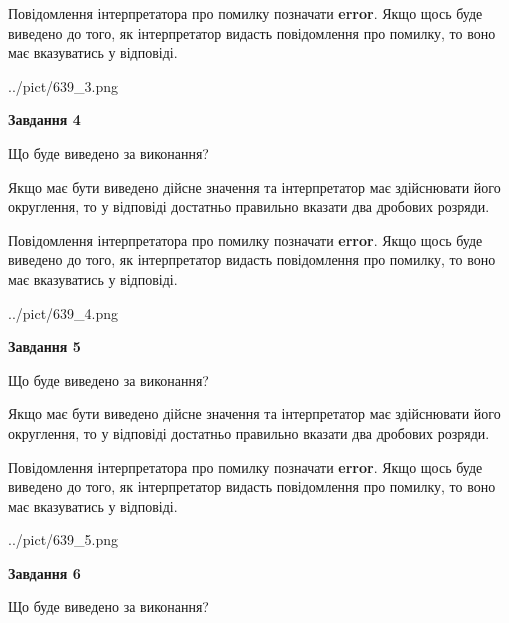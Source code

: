 \documentclass[12pt, ukrainian]{article}
\begin{document}
{\begin {Large}
Повідомлення інтерпретатора про помилку позначати \textbf{error}.
Якщо щось буде виведено до того, як інтерпретатор видасть повідомлення про помилку, 
то воно має вказуватись у відповіді. \par

\begin{center}
	{../pict/639_3.png}
\end{center}
\newpage

{\begin {center}\textbf{Завдання 4}\end {center}}\par
Що буде виведено за виконання? \par

Якщо має бути виведено дійсне значення та інтерпретатор має здійснювати його округлення, 
то у відповіді достатньо правильно вказати два дробових розряди.

Повідомлення інтерпретатора про помилку позначати \textbf{error}.
Якщо щось буде виведено до того, як інтерпретатор видасть повідомлення про помилку, 
то воно має вказуватись у відповіді. \par

\begin{center}
	{../pict/639_4.png}
\end{center}
\newpage

{\begin {center}\textbf{Завдання 5}\end {center}}\par
Що буде виведено за виконання? \par

Якщо має бути виведено дійсне значення та інтерпретатор має здійснювати його округлення, 
то у відповіді достатньо правильно вказати два дробових розряди.

Повідомлення інтерпретатора про помилку позначати \textbf{error}.
Якщо щось буде виведено до того, як інтерпретатор видасть повідомлення про помилку, 
то воно має вказуватись у відповіді. \par

\begin{center}
	{../pict/639_5.png}
\end{center}
\newpage

{\begin {center}\textbf{Завдання 6}\end {center}}\par
Що буде виведено за виконання? \par


\end{Large}}
\end{document}
